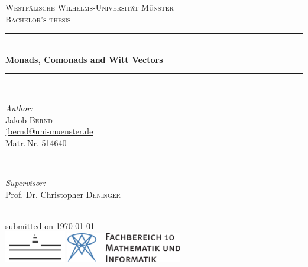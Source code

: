 \documentclass[a4paper,index=totoc,toc=bibliography,fontsize=11,DIV=13,headinclude,twoside,BCOR=12mm,cleardoublepage=empty,headsepline=1pt]{scrreprt}
\begin{document}
\begin{titlepage}
	\newcommand{\HRule}{\rule{\linewidth}{0.5mm}} %

	\center %
 

	\textsc{\LARGE Westfälische Wilhelms-Universität Münster}\\[1.4cm] %
	\textsc{\Large Bachelor's thesis}\\[0.5cm] %


	\HRule \\[0.4cm]
	
	{\onehalfspacing\huge\sffamily\bfseries Monads, Comonads and Witt Vectors \singlespacing} %
	\vspace{-0.4cm}
	\HRule \\[1.5cm] 
	

	\begin{minipage}[t]{0.45\textwidth}
	\begin{flushleft} \large
	\emph{Author:}\\
	Jakob \textsc{Bernd}\\ %
	\normalsize \url{jbernd@uni-muenster.de}\\
	Matr.\,Nr. 514640
	\end{flushleft}
	\end{minipage}
	~
	\begin{minipage}[t]{0.47\textwidth}
	\begin{flushright} \large
	\emph{Supervisor:} \\
	Prof. Dr. Christopher \textsc{Deninger}\\ %
	\end{flushright}
	\end{minipage}\\[4cm]

	{\large submitted on \today}\\[3cm] %

	\includegraphics[width=0.2\textwidth]{resources/WWU_Logo.png}
	\includegraphics[height=1.3cm,keepaspectratio]{resources/fb10logo.pdf}\\[1cm] %
	

	\vfill %
	
\end{titlepage}
\end{document}
